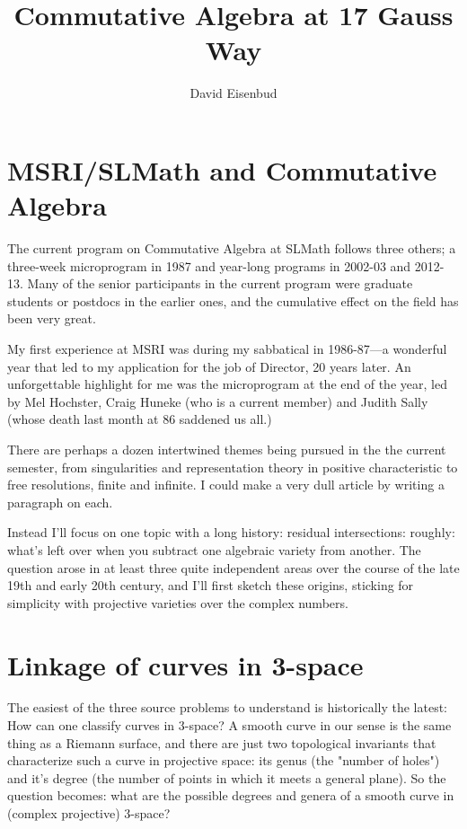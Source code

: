 \documentclass[11pt, oneside]{article}   	%
\title{Commutative Algebra at 17 Gauss Way}
\author{David Eisenbud}
\begin{document}
\maketitle
\section{MSRI/SLMath and Commutative Algebra}

The current program on Commutative Algebra at SLMath follows three others; a three-week microprogram in 1987 and year-long programs in 2002-03 and 2012-13. Many of the senior participants in the current program were graduate students or postdocs in the earlier ones, and the cumulative effect on the field has been very great.

My first experience at MSRI was during my sabbatical in 1986-87---a wonderful year that led to my application for the job of Director, 20 years later. An unforgettable highlight for me was the microprogram at the end of the year, led by Mel Hochster, Craig Huneke (who is a current member) and Judith Sally (whose death last month at 86 saddened us all.)

There are perhaps a dozen intertwined themes being pursued in the the current semester, from singularities and representation theory in positive characteristic to free resolutions, finite and infinite. I could make a very dull article by writing a paragraph on each. 

Instead I'll focus on one topic with a long history: residual intersections: roughly: what's left over when you subtract one algebraic variety from another. The question arose in at least three quite independent areas over the course of the late 19th and early 20th century, and I'll first sketch these origins, sticking for simplicity with projective varieties over the complex numbers.

\section{Linkage of curves in 3-space} The easiest of the three source problems to understand is historically the latest: How can one classify curves in 3-space? A smooth curve in our sense is the same thing as a Riemann surface, and there are just two topological invariants that characterize such a curve in projective space: its genus (the "number of holes") and it's degree (the number of points in which it meets a general plane). So the question becomes: what are the possible degrees and genera
of a smooth curve in (complex projective) 3-space?
\end{document}
